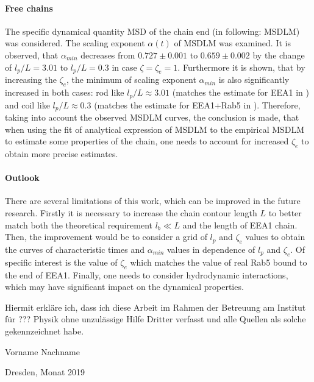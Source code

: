 \documentclass[
    paper=A4,pagesize=automedia,fontsize=12pt,
    BCOR=15mm,DIV=22,
    twoside,headinclude,footinclude=false,
    fleqn,             %
    bibliography=totocnumbered,          %
    listof=totoc,                %
    listof=flat,                 %
    cleardoublepage=empty      %
    numbers=endperiod
]{scrartcl}
\begin{document}
\paragraph{Free chains}
The specific dynamical quantity MSD of the chain end (in following: MSDLM) was 
considered. The scaling exponent $\alpha(t)$ of MSDLM was examined. 
It is observed, that $\alpha_{min}$ decreases from $0.727 \pm 0.001$ to $0.659 \pm 0.002$ 
by the change of $l_p/L=3.01$ to $l_p/L=0.3$ in case $\zeta=\zeta_e=1$.
Furthermore it is shown, that
by increasing the $\zeta_e$, the minimum of scaling exponent $\alpha_{min}$ is also 
significantly increased in both cases: rod like $l_p/L \approx 3.01$ (matches the 
estimate for EEA1 in \cite{Singh:2022}) and
coil like  $l_p/L \approx 0.3$ (matches the estimate for EEA1+Rab5 in \cite{Singh:2022}).
Therefore, taking into account the observed MSDLM curves, the conclusion is made,
that when using the fit of analytical expression of MSDLM to the empirical MSDLM 
to estimate some properties of the chain, one needs to account
for increased $\zeta_e$ to obtain more precise estimates.

\paragraph{Outlook}
There are several limitations of this work, which can be improved in the future research.
Firstly it is necessary to increase the chain contour length $L$ to better match both the
theoretical requirement $l_b \ll L$ and the length of EEA1 chain. Then, the improvement 
would be to consider a grid of $l_p$ and $\zeta_e$ values to obtain the 
curves of characteristic times and $\alpha_{min}$ values in dependence of 
$l_p$ and $\zeta_e$. Of specific interest is the value of $\zeta_e$ which matches 
the value of real Rab5 bound to the end of EEA1. Finally, one needs to
consider hydrodynamic interactions, which may have significant impact on the dynamical
properties.  


\clearpage
\thispagestyle{empty}
\vspace*{1.5em}

Hiermit erkläre ich, dass ich diese Arbeit im Rahmen der Betreuung am Institut
für ??? Physik ohne unzulässige Hilfe Dritter verfasst und alle Quellen als solche gekennzeichnet habe.

\vspace*{45em}

Vorname Nachname \par
Dresden, Monat 2019



\end{document}

